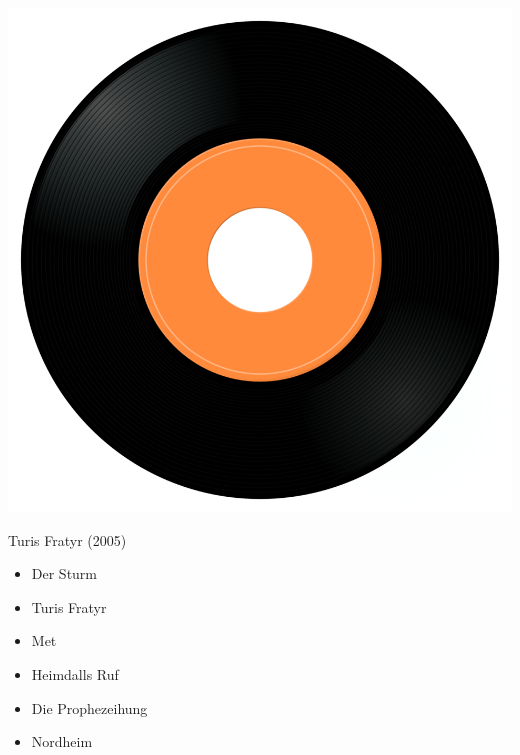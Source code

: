 \begin{minipage}[t]{0.25\textwidth}
\captionsetup{type=figure}
\includegraphics[width=\textwidth]{Images/cover.png}
\caption*{Turis Fratyr (2005)}
\end{minipage}
\begin{minipage}[t]{0.25\textwidth}\vspace{0pt}
\begin{itemize}[nosep,leftmargin=1em,labelwidth=*,align=left]
	\setlength{\itemsep}{0pt}
	\item Der Sturm 
	\item Turis Fratyr
	\item Met
	\item Heimdalls Ruf
	\item Die Prophezeihung
	\item Nordheim
\end{itemize}
\end{minipage}
